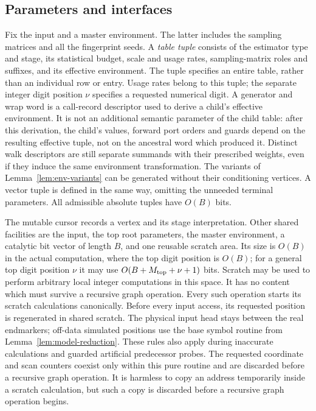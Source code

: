 \subsection{Parameters and interfaces}\label{sec:ctrl-model}

Fix the input and a master environment.  The latter includes the sampling matrices and all the fingerprint seeds.  A \emph{table tuple} consists of
the estimator type and stage, its statistical budget, scale and usage
rates, sampling-matrix roles and suffixes, and its effective environment.  The
tuple specifies an entire table, rather than an individual row or entry.
Usage rates belong to this tuple; the separate integer digit position $\nu$
specifies a requested numerical digit.
A generator and wrap word is a call-record descriptor used to derive a
child's effective environment.  It is not an additional semantic
parameter of the child table: after this derivation, the child's values,
forward port orders and guards depend on the resulting effective tuple,
not on the ancestral word which produced it.  Distinct walk descriptors
are still separate summands with their prescribed weights, even if they
induce the same environment transformation.  The variants of
Lemma~\ref{lem:env-variants} can be generated without their conditioning
vertices.  A vector tuple is defined in the same way, omitting the
unneeded terminal parameters.  All admissible absolute tuples have
$O(B)$ bits.

The mutable cursor records a vertex and its stage interpretation.  Other shared facilities are the input, the top root parameters, the master
environment, a catalytic bit vector of length $B$, and one reusable
scratch area.  Its size is $O(B)$ in the actual computation, where the
top digit position is $O(B)$; for a general top digit position $\nu$ it may use
$O(B+M_{\rm top}+\nu+1)$ bits.  Scratch may be used to perform arbitrary local integer
computations in this space.  It has no content which must survive a
recursive graph operation.  Every such operation starts its scratch
calculations canonically. Before every input access, its requested
position is regenerated in shared scratch. The physical
input head stays between the real endmarkers; off-data simulated
positions use the base symbol routine from
Lemma~\ref{lem:model-reduction}. These rules also apply during inaccurate
calculations and guarded artificial predecessor probes. The requested
coordinate and scan counters coexist only within this pure routine and
are discarded before a recursive graph operation. It is harmless to
copy an address temporarily
inside a scratch calculation, but such a copy is discarded before a
recursive graph operation begins.

